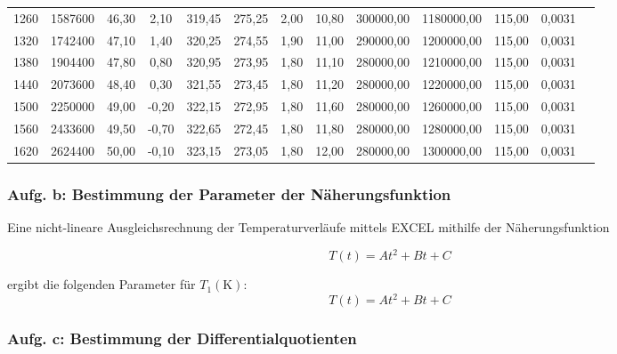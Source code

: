 \begin{table}
\begin{tabular}{S[table-format=3.0] S S S S S S S S S S S S[table-format=3.2]}
      1260  &   1587600   &   46,30   &     2,10   &  319,45   &  275,25   &      2,00   &     10,80   &  300000,00   &  1180000,00   &  115,00    &      0,0031  \\
      1320  &   1742400   &   47,10   &     1,40   &  320,25   &  274,55   &      1,90   &     11,00   &  290000,00   &  1200000,00   &  115,00    &      0,0031  \\
      1380  &   1904400   &   47,80   &     0,80   &  320,95   &  273,95   &      1,80   &     11,10   &  280000,00   &  1210000,00   &  115,00    &      0,0031  \\
      1440  &   2073600   &   48,40   &     0,30   &  321,55   &  273,45   &      1,80   &     11,20   &  280000,00   &  1220000,00   &  115,00    &      0,0031  \\
      1500  &   2250000   &   49,00   &    -0,20   &  322,15   &  272,95   &      1,80   &     11,60   &  280000,00   &  1260000,00   &  115,00    &      0,0031  \\
      1560  &   2433600   &   49,50   &    -0,70   &  322,65   &  272,45   &      1,80   &     11,80   &  280000,00   &  1280000,00   &  115,00    &      0,0031  \\
      1620  &   2624400   &   50,00   &    -0,10   &  323,15   &  273,05   &      1,80   &     12,00   &  280000,00   &  1300000,00   &  115,00    &      0,0031  \\
      \bottomrule
    \end{tabular}
  \end{table}


\subsubsection{Aufg. b: Bestimmung der Parameter der Näherungsfunktion}

Eine nicht-lineare Ausgleichsrechnung der Temperaturverläufe mittels EXCEL mithilfe der Näherungsfunktion

\begin{equation} 
  T(t) = At^2 + Bt + C 
\end{equation}

ergibt die folgenden Parameter für $T_{1} (\unit{\kelvin})$:
\begin{equation} 
  T(t) = At^2 + Bt + C 
\end{equation}


\subsubsection{Aufg. c: Bestimmung der Differentialquotienten}


